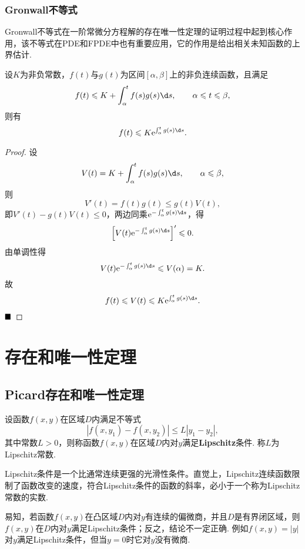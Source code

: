 \documentclass[lang=cn,10pt]{elegantbook}
\begin{document}
\subsection{Gronwall不等式}
Gronwall不等式在一阶常微分方程解的存在唯一性定理的证明过程中起到核心作用，该不等式在PDE和FPDE中也有重要应用，它的作用是给出相关未知函数的上界估计.
\begin{theorem}
	设$K$为非负常数，$f(t)$与$g(t)$为区间$\left[\alpha,\beta\right]$上的非负连续函数，且满足
	$$f(t)\leqslant K+\int_{\alpha}^{t}f(s)g(s)\d s,\qquad \alpha\leqslant t\leqslant\beta,$$
	则有
	$$f(t)\leqslant K\mathrm{e}^{\int_{\alpha}^{t}g(s)\d s}.$$
\end{theorem}
\begin{proof}
	设
	$$V(t)=K+\int_{\alpha}^{t}f(s)g(s)\d s,\qquad \alpha\leqslant\beta,$$
	则
	$$V'(t)=f(t)g(t)\leqslant g(t)V(t),$$
	即$V'(t)-g(t)V(t)\leqslant 0$，两边同乘$\mathrm{e}^{-\int_{\alpha}^{t}g(s)\d s}$，得
	$$\left[V(t)\mathrm{e}^{-\int_{\alpha}^{t}g(s)\d s}\right]'\leqslant 0.$$
	由单调性得
	$$V(t)\mathrm{e}^{-\int_{\alpha}^{t}g(s)\d s}\leqslant V(\alpha)=K.$$
	故
	$$f(t)\leqslant V(t)\leqslant K\mathrm{e}^{\int_{\alpha}^{t}g(s)\d s}.$$
	$\hfill\blacksquare$
\end{proof}
	
\chapter{存在和唯一性定理}
\section{Picard存在和唯一性定理}
\begin{definition}[Lipschitz条件]
	设函数$f(x,y)$在区域$D$内满足不等式
	$$|f(x,y_1)-f(x,y_2)|\leqslant L|y_1-y_2|,$$
	其中常数$L>0$，则称函数$f(x,y)$在区域$D$内对$y$满足\textbf{Lipschitz}{\heiti 条件}. 称$L$为Lipschitz常数.
\end{definition}
Lipschitz条件是一个比通常连续更强的光滑性条件。直觉上，Lipschitz连续函数限制了函数改变的速度，符合Lipschitz条件的函数的斜率，必小于一个称为Lipschitz常数的实数.

易知，若函数$f(x,y)$在凸区域$D$内对$y$有连续的偏微商，并且$D$是有界闭区域，则$f(x,y)$在$D$内对$y$满足Lipschitz条件；反之，结论不一定正确. 例如$f(x,y)=|y|$对$y$满足Lipschitz条件，但当$y=0$时它对$y$没有微商.
\end{document}
